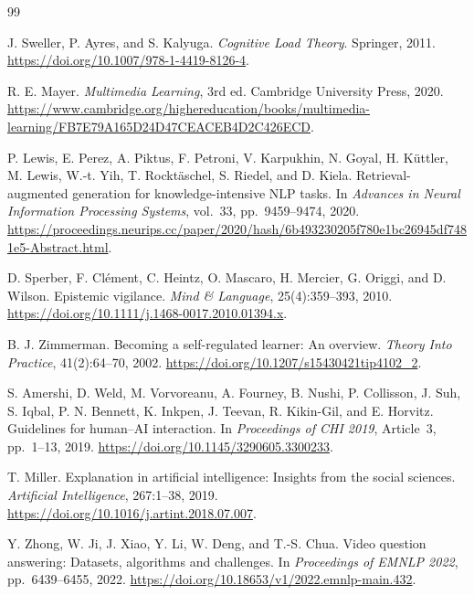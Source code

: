 \documentclass[manuscript,screen,nonacm]{acmart}
\begin{document}
\begin{thebibliography}{99}

J. Sweller, P. Ayres, and S. Kalyuga.
\newblock \emph{Cognitive Load Theory}.
\newblock Springer, 2011.
\newblock
\url{https://doi.org/10.1007/978-1-4419-8126-4}.

R. E. Mayer.
\newblock \emph{Multimedia Learning}, 3rd ed.
\newblock Cambridge University Press, 2020.
\newblock
\url{https://www.cambridge.org/highereducation/books/multimedia-learning/FB7E79A165D24D47CEACEB4D2C426ECD}.

P. Lewis, E. Perez, A. Piktus, F. Petroni,
V. Karpukhin, N. Goyal, H. K\"uttler,
M. Lewis, W.-t. Yih, T. Rockt\"aschel,
S. Riedel, and D. Kiela.
\newblock Retrieval-augmented generation for
knowledge-intensive NLP tasks.
\newblock In \emph{Advances in Neural Information
Processing Systems}, vol.~33,
pp.~9459--9474, 2020.
\newblock
\url{https://proceedings.neurips.cc/paper/2020/hash/6b493230205f780e1bc26945df7481e5-Abstract.html}.

D. Sperber, F. Cl\'ement, C. Heintz,
O. Mascaro, H. Mercier, G. Origgi,
and D. Wilson.
\newblock Epistemic vigilance.
\newblock \emph{Mind \& Language},
25(4):359--393, 2010.
\newblock
\url{https://doi.org/10.1111/j.1468-0017.2010.01394.x}.

B. J. Zimmerman.
\newblock Becoming a self-regulated learner:
An overview.
\newblock \emph{Theory Into Practice},
41(2):64--70, 2002.
\newblock
\url{https://doi.org/10.1207/s15430421tip4102_2}.

S. Amershi, D. Weld, M. Vorvoreanu,
A. Fourney, B. Nushi, P. Collisson,
J. Suh, S. Iqbal, P. N. Bennett,
K. Inkpen, J. Teevan, R. Kikin-Gil,
and E. Horvitz.
\newblock Guidelines for human--AI interaction.
\newblock In \emph{Proceedings of CHI 2019},
Article~3, pp.~1--13, 2019.
\newblock
\url{https://doi.org/10.1145/3290605.3300233}.

T. Miller.
\newblock Explanation in artificial intelligence:
Insights from the social sciences.
\newblock \emph{Artificial Intelligence},
267:1--38, 2019.
\newblock
\url{https://doi.org/10.1016/j.artint.2018.07.007}.

Y. Zhong, W. Ji, J. Xiao, Y. Li,
W. Deng, and T.-S. Chua.
\newblock Video question answering:
Datasets, algorithms and challenges.
\newblock In \emph{Proceedings of EMNLP 2022},
pp.~6439--6455, 2022.
\newblock
\url{https://doi.org/10.18653/v1/2022.emnlp-main.432}.


\end{thebibliography}
\end{document}
